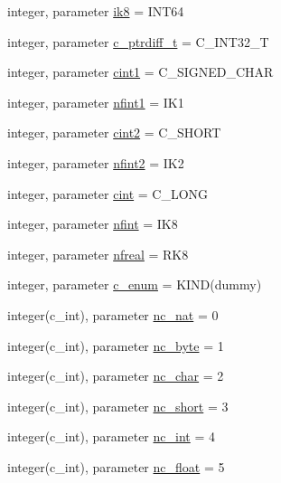 \begin{DoxyCompactItemize}
\item 
integer, parameter \hyperlink{namespacenetcdf__nc__data_aa1206c3233d0d4a8e710ae6735c91e04}{ik8} = I\+N\+T64
\item 
integer, parameter \hyperlink{namespacenetcdf__nc__data_a9dda9236f2034635d169f1765371dce2}{c\+\_\+ptrdiff\+\_\+t} = C\+\_\+\+I\+N\+T32\+\_\+T
\item 
integer, parameter \hyperlink{namespacenetcdf__nc__data_abfc4f343e83d52584cd01dc03498ffd8}{cint1} = C\+\_\+\+S\+I\+G\+N\+E\+D\+\_\+\+C\+H\+AR
\item 
integer, parameter \hyperlink{namespacenetcdf__nc__data_a3a80274c89dd79214673726d6d4fcb71}{nfint1} = I\+K1
\item 
integer, parameter \hyperlink{namespacenetcdf__nc__data_a78dd021096115a07bb600a66e8043e66}{cint2} = C\+\_\+\+S\+H\+O\+RT
\item 
integer, parameter \hyperlink{namespacenetcdf__nc__data_ade9f082f280165194fd84dbbc76d1ace}{nfint2} = I\+K2
\item 
integer, parameter \hyperlink{namespacenetcdf__nc__data_aec392a25dd2a0cd8c1170fc7623ec503}{cint} = C\+\_\+\+L\+O\+NG
\item 
integer, parameter \hyperlink{namespacenetcdf__nc__data_a32e1eadaff45631ba5d0930d2112f3dd}{nfint} = I\+K8
\item 
integer, parameter \hyperlink{namespacenetcdf__nc__data_a38828b33e056b8b908849cb7db2528c0}{nfreal} = R\+K8
\item 
integer, parameter \hyperlink{namespacenetcdf__nc__data_ad81dcac084fe7c7112c958b310d9d408}{c\+\_\+enum} = K\+I\+ND(dummy)
\item 
integer(c\+\_\+int), parameter \hyperlink{namespacenetcdf__nc__data_ae7aadc2122b946f9bc93bc14f134f111}{nc\+\_\+nat} = 0
\item 
integer(c\+\_\+int), parameter \hyperlink{namespacenetcdf__nc__data_a17953f2b51e4acea33c2df068cba45c6}{nc\+\_\+byte} = 1
\item 
integer(c\+\_\+int), parameter \hyperlink{namespacenetcdf__nc__data_a36ff919052313a4a3bd95596c4795a84}{nc\+\_\+char} = 2
\item 
integer(c\+\_\+int), parameter \hyperlink{namespacenetcdf__nc__data_a432fdf219e0ef17a34c2598005514bb4}{nc\+\_\+short} = 3
\item 
integer(c\+\_\+int), parameter \hyperlink{namespacenetcdf__nc__data_ace0e95a04f7e62638aeb03fd25aebf16}{nc\+\_\+int} = 4
\item 
integer(c\+\_\+int), parameter \hyperlink{namespacenetcdf__nc__data_ac5ea238705a0ae9d07ec00344189ef94}{nc\+\_\+float} = 5

\end{DoxyCompactItemize}
